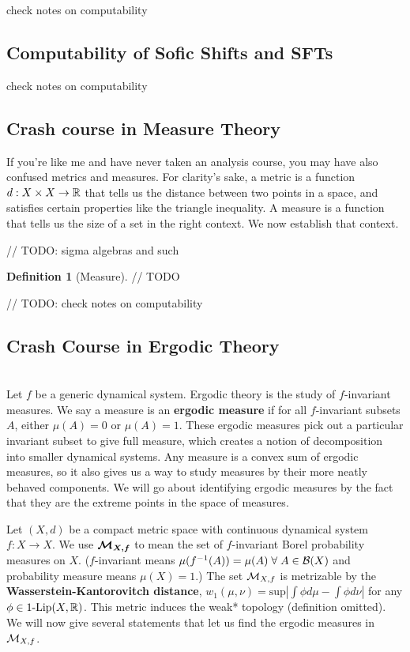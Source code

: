 \documentclass[11pt, reqno]{amsart}
\theoremstyle{plain}
\theoremstyle{definition}
\newtheorem{defn}[thm]{Definition}
\begin{document}
check notes on computability

\subsection{Computability of Sofic Shifts and SFTs}\cite[L7]{wolf}  

check notes on computability

\subsection{Crash course in Measure Theory}\cite[L6]{wolf}  
If you're like me and have never taken an analysis course, you may have also confused metrics and measures. For clarity's sake, a metric is a function $d: X \times X \rightarrow \mathbb{R}$ that tells us the distance between two points in a space, and satisfies certain properties like the triangle inequality. A measure is a function that tells us the size of a set in the right context. We now establish that context.

// TODO: sigma algebras and such

\begin{defn}[Measure]
  // TODO
\end{defn}

// TODO: check notes on computability

\subsection{Crash Course in Ergodic Theory}\cite[L10]{wolf} \\
Let $f$ be a generic dynamical system. Ergodic theory is the study of $f$-invariant measures. We say a measure is an \textbf{ergodic measure} if for all $f$-invariant subsets $A$, either $\mu(A) = 0$ or $\mu(A) = 1$. These ergodic measures pick out a particular invariant subset to give full measure, which creates a notion of decomposition into smaller dynamical systems. Any measure is a convex sum of ergodic measures, so it also gives us a way to study measures by their more neatly behaved components. We will go about identifying ergodic measures by the fact that they are the extreme points in the space of measures. 

Let $(X, d)$ be a compact metric space with continuous dynamical system $f: X \rightarrow X$. We use $\boldsymbol{\mathcal{M}_{X,f}}$ to mean the set of $f$-invariant Borel probability measures on $X$. ($f$-invariant means $\mu(f^{-1}(A)) = \mu(A) \;\forall\; A \in \mathcal{B}(X)$ and probability measure means $\mu(X) = 1$.) The set $\mathcal{M}_{X,f}$ is metrizable by the \textbf{Wasserstein-Kantorovitch distance}, $w_1(\mu, \nu) = \text{sup}|\int \phi d\mu - \int \phi d\nu|$ for any $\phi \in 1\text{-Lip}(X,\mathbb{R})$. This metric induces the weak* topology (definition omitted). We will now give several statements that let us find the ergodic measures in $\mathcal{M}_{X,f}$.
\end{document}
